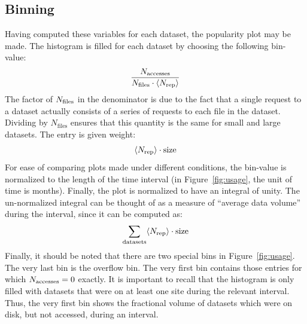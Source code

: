 \subsection{Binning}

Having computed these variables for each dataset, the popularity plot may be
made. The histogram is filled for each dataset by choosing the following
bin-value:
%
\begin{equation}
  \dfrac{N_\text{accesses}}{N_\text{files}\cdot \langle N_\text{rep}\rangle}
\end{equation}
%
The factor of $N_\text{files}$ in the denominator is due to the fact that a single request
to a dataset actually consists of a series of requests to each file in the
dataset. Dividing by $N_\text{files}$ ensures that this quantity is the same for
small and large datasets. The entry is given weight:
%
\begin{equation}
  \langle N_\text{rep}\rangle\cdot \text{size}
\end{equation}
%
For ease of comparing plots made under different conditions, the bin-value is
normalized to the length of the time interval (in Figure~\ref{fig:usage}, the unit of time is
months). Finally, the plot is normalized to have an integral of unity. The
un-normalized integral can be thought of as a measure of ``average data volume''
during the interval, since it can be computed as:
%
\begin{equation}
  \sum_\text{datasets} \langle N_\text{rep}\rangle \cdot \text{size}
\end{equation}
%
Finally, it should be noted that there are two special bins in
Figure~\ref{fig:usage}. The very last bin is the overflow bin. The very first
bin contains those entries for which $N_\text{accesses}=0$ exactly. It is important to recall
that the histogram is only filled with datasets that were on at least one site
during the relevant interval. Thus, the very first bin shows the fractional
volume of datasets which were on disk, but not accessed, during an interval.

